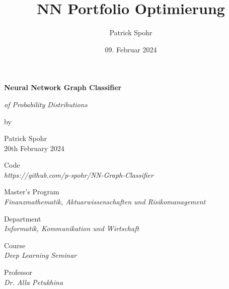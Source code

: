 \documentclass[12pt]{article}
\title{NN Portfolio Optimierung}
\date{09. Februar 2024}
\author{Patrick Spohr}
\begin{document}
    \renewcommand{\figurename}{Visual}
    \renewcommand{\tablename}{Visual}

    \begin{titlepage}
        
        \centering
        \Huge \textbf{Neural Network Graph Classifier}

        \vspace{7mm}
        
        \centering
        \Large \textit{of Probability Distributions} 

        \vspace{7mm}

        \centering
        \large by

        \vspace{7mm}

        \large Patrick Spohr
        \vspace{2mm}
        \\ 20th February 2024

        \vspace{10mm}

        \centering
        \large Code
        \vspace{1mm}
        \\ \normalsize \textit{https://github.com/p-spohr/NN-Graph-Classifier} 
        
        \vspace{20mm}

        \centering
        \large Master’s Program
        \vspace{1mm}
        \\ \normalsize \textit{Finanzmathematik, Aktuarwissenschaften und Risikomanagement} 

        \vspace{5mm}

        \centering
        \large Department
        \vspace{1mm}
        \\ \normalsize \textit{Informatik, Kommunikation und Wirtschaft} 

        \vspace{5mm}

        \centering
        \large Course 
        \vspace{1mm}       
        \\ \normalsize \textit{Deep Learning Seminar} 

        \vspace{5mm}

        \centering
        \large Professor
        \vspace{1mm}
        \\ \normalsize \textit{Dr. Alla Petukhina} 


    \end{titlepage}
\end{document}
